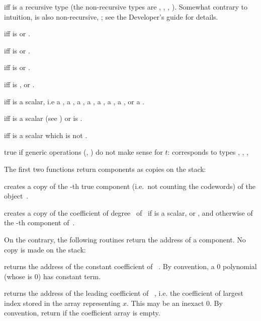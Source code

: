   iff  is a recursive
type (the non-recursive types are , ,
, ). Somewhat contrary to intuition,  is
also non-recursive, ; see the Developer's guide for details.

  iff  is 
or .

  iff  is 
or .

  iff  is 
or .

  iff  is , 
or .

  iff  is a scalar, i.e
a ,
a ,
a ,
a ,
a ,
a ,
a ,
or
a .

  iff  is a scalar (see
) or  is .

  iff  is a scalar which is not
.

 true if generic operations (,
) do not make sense for $t$: corresponds to types
, , , 

\label{se:accessors}
The first two functions return  components as copies on the stack:

 creates a copy of the -th true
component (i.e.\ not counting the codewords) of the object~.

 creates a copy of the coefficient of
degree~ of~ if  is a scalar,  or ,
and otherwise of the -th component of~.
\smallskip

\noindent On the contrary, the following routines return the address of a
 component. No copy is made on the stack:

 returns the address of the constant
coefficient of ~. By convention, a $0$ polynomial (whose
 is $0$) has  constant term.

 returns the address of the leading coefficient
of ~, i.e. the coefficient of largest index stored in the
array representing $x$. This may be an inexact $0$. By convention, return
 if the coefficient array is empty.


